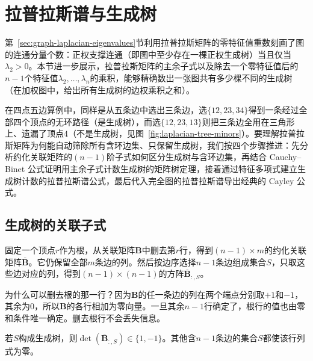 \section{拉普拉斯谱与生成树}
\label{sec:graph-matrix-tree}

第~\ref{sec:graph-laplacian-eigenvalues}节利用拉普拉斯矩阵的零特征值重数刻画了图的连通分量个数：正权支撑连通（即图中至少存在一棵正权生成树）当且仅当$\lambda_2>0$。本节进一步展示，拉普拉斯矩阵的主余子式以及除去一个零特征值后的$n-1$个特征值$\lambda_2,\ldots,\lambda_n$的乘积，能够精确数出一张图共有多少棵不同的生成树（在加权图中，给出所有生成树的边权乘积之和）。

在四点五边算例中，同样是从五条边中选出三条边，选$\{12,23,34\}$得到一条经过全部四个顶点的无环路径（是生成树），而选$\{12,23,13\}$则把三条边全用在三角形上、遗漏了顶点$4$（不是生成树，见图~\ref{fig:laplacian-tree-minors}）。要理解拉普拉斯矩阵为何能自动筛除所有含环边集、只保留生成树，我们按四个步骤推进：先分析约化关联矩阵的$(n-1)$阶子式如何区分生成树与含环边集，再结合 Cauchy--Binet 公式证明用主余子式计数生成树的矩阵树定理，接着通过特征多项式建立生成树计数的拉普拉斯谱公式，最后代入完全图的拉普拉斯谱导出经典的 Cayley 公式。

\subsection{生成树的关联子式}
\label{sec:graph-tree-incidence-minors}

固定一个顶点$r$作为根，从关联矩阵$\bm B$中删去第$r$行，得到$(n-1)\times m$的约化关联矩阵$\overline{\bm B}$。它仍保留全部$m$条边的列。然后按边序选择$n-1$条边组成集合$S$，只取这些边对应的列，得到$(n-1)\times(n-1)$的方阵$\overline{\bm B}_{:,S}$。

为什么可以删去根的那一行？因为$\bm B$的任一条边的列在两个端点分别取$+1$和$-1$，其余为$0$，所以$\bm B$的各行相加为零向量。一旦其余$n-1$行确定了，根行的值也由零和条件唯一确定。删去根行不会丢失信息。

\begin{lemma}[生成树的关联子式]
\label{lem:graph-tree-incidence-minors}
若$S$构成生成树，则$\det(\overline{\bm B}_{:,S})\in\{1,-1\}$。其他含$n-1$条边的集合$S$都使该行列式为零。
\end{lemma}

